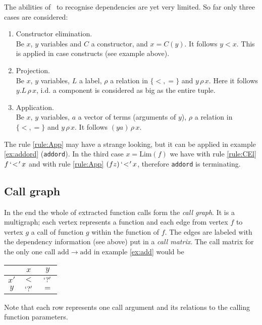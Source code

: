 The abilities of \foetus\ to recognise dependencies are yet very
limited. So far only three cases are considered:
\begin{enumerate}
\item Constructor elimination.\label{rule:CEl}\\
Be $x$, $y$ variables and $C$ a constructor, and $x=C(y)$. It follows
$y \less x$. This is applied in case constructs (see example above).
\item Projection.\label{rule:Proj}\\
Be $x$, $y$ variables, $L$ a label, $\rho$ a relation in $\{\less,
\equal\}$ and $y \,\rho\, x$. Here it follows $y.L \,\rho\, x$, i.d. a
component is considered as big as the entire tuple.
\item Application.\label{rule:App}\\
Be $x$, $y$ variables, $a$ a vector of terms (arguments of $y$),
$\rho$ a relation in $\{\less, \equal\}$ and $y \,\rho\, x$. It
follows $(y a) \,\rho\, x$.
\end{enumerate}
The rule \ref{rule:App} may have a strange looking, but it can be
applied in example \ref{ex:addord} ({\tt addord}).
In the third case $x = \mathrm{Lim}(f)$ we have with rule
\ref{rule:CEl} $f \,`\!<\!'\, x$ and with rule \ref{rule:App}
$(f z) \,`\!<\!'\, x$, therefore {\tt addord} is terminating.

\subsection{Call graph}
In the end the whole of extracted function calls form the {\em call
  graph}. It is a multigraph; each vertex represents a function and each
edge from vertex $f$ to vertex $g$ a call of function $g$ within the
function of $f$. The edges are labeled with the dependency information
(see above) put in a {\em call matrix}. The call matrix for the only
one call $\mathrm{add}\rightarrow\mathrm{add}$ in example \ref{ex:add}
would be
\begin{center}
\begin{tabular}{c|cc}
     &   $x$      &    $y$ \\
\hline
$x'$ & $\less$    & $`?'$ \\
$y$  & $`?'$ & $\equal$
\end{tabular}
\end{center}
Note that each row represents one call argument and its relations to
the calling function parameters.

